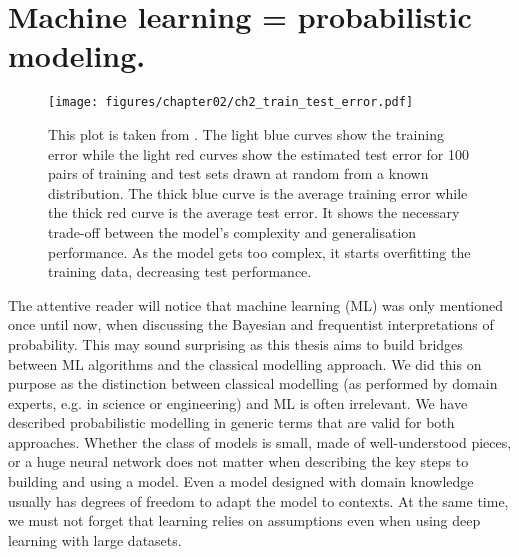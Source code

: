 \section{Machine learning = probabilistic modeling.}
\begin{figure}
  \centering
  \texttt{[image: figures/chapter02/ch2\_train\_test\_error.pdf]}
  \caption{This plot is taken from \citet{louppe2014understanding}.
  The light blue curves show the training error while the
  light red curves show the estimated test error for 100
  pairs of training and test sets drawn at random
  from a known distribution. The thick blue curve is the average
  training error while the thick red curve is the average test error.
  It shows the necessary trade-off between the model's complexity and generalisation performance. As the model gets too complex, it starts overfitting the training data, decreasing test performance.}
  \label{fig:ch02:learning_curves}
\end{figure}
The attentive reader will notice that machine learning (ML) was only mentioned once until now, when discussing the Bayesian and frequentist interpretations of probability.
This may sound surprising as this thesis aims to build bridges between ML algorithms and the classical modelling approach. We did this on purpose as the distinction between classical modelling (as performed by domain experts, e.g. in science or engineering) and ML is often irrelevant. We have described probabilistic modelling in generic terms that are valid for both approaches. Whether the class of models is small, made of well-understood pieces, or a huge neural network does not matter when describing the key steps to building and using a model. Even a model designed with domain knowledge usually has degrees of freedom to adapt the model to contexts. At the same time, we must not forget that learning relies on assumptions even when using deep learning with large datasets.


